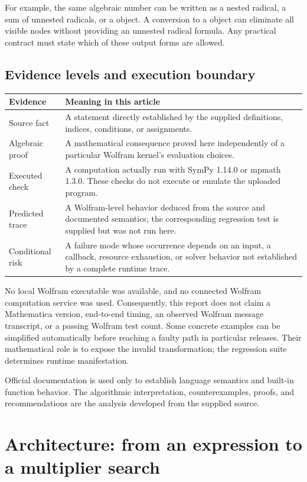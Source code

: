\documentclass[11pt,letterpaper]{article}
\newcommand{\code}[1]{\texttt{\detokenize{#1}}}
\theoremstyle{definition}
\begin{document}
For example, the same algebraic number can be written as a nested radical, a sum
of unnested radicals, or a \code{Root} object. A conversion to a \code{Root} object
can eliminate all visible \code{Power} nodes without providing an unnested radical
formula. Any practical contract must state which of these output forms are allowed.

\subsection{Evidence levels and execution boundary}
\begin{longtable}{@{}p{}p{}@{}}
\toprule
Evidence & Meaning in this article\\\midrule
\endhead
Source fact & A statement directly established by the supplied definitions, indices,
conditions, or assignments.\\
Algebraic proof & A mathematical consequence proved here independently of a particular
Wolfram kernel's evaluation choices.\\
Executed check & A computation actually run with SymPy 1.14.0 or mpmath 1.3.0.
These checks do not execute or emulate the uploaded program.\\
Predicted trace & A Wolfram-level behavior deduced from the source and documented
semantics; the corresponding regression test is supplied but was not run here.\\
Conditional risk & A failure mode whose occurrence depends on an input, a callback,
resource exhaustion, or solver behavior not established by a complete runtime trace.\\
\bottomrule
\end{longtable}
No local Wolfram executable was available, and no connected Wolfram computation
service was used. Consequently, this report does not claim a Mathematica version,
end-to-end timing, an observed Wolfram message transcript, or a passing Wolfram test
count. Some concrete examples can be simplified automatically before reaching a
faulty path in particular releases. Their mathematical role is to expose the
invalid transformation; the regression suite determines runtime manifestation.

Official documentation is used only to establish language semantics and built-in
function behavior. The algorithmic interpretation, counterexamples, proofs, and
recommendations are the analysis developed from the supplied source.

\section{Architecture: from an expression to a multiplier search}
\label{sec:architecture}
\end{document}
